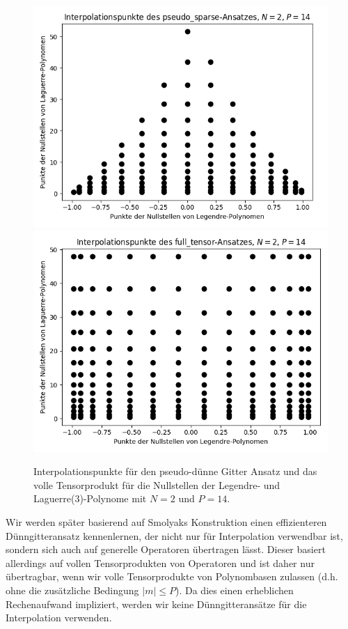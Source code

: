 \begin{figure}[!htb]
\centering
{}
  \includegraphics[width=\linewidth]{Figures/roots_pseudo_sparse.png}
\endminipage
{}
  \includegraphics[width=\linewidth]{Figures/roots_full_tensor.png}
\endminipage
\caption{Interpolationspunkte für den pseudo-dünne Gitter Ansatz und das volle Tensorprodukt für die Nullstellen der Legendre- und Laguerre(3)-Polynome mit $N=2$ und $P=14$.}
\label{fig:roots_two_dim}
\end{figure}

Wir werden später basierend auf Smolyaks Konstruktion einen effizienteren Dünngitteransatz kennenlernen, der nicht nur für Interpolation verwendbar ist, sondern sich auch auf generelle Operatoren übertragen lässt. Dieser basiert allerdings auf vollen Tensorprodukten von Operatoren und ist daher nur übertragbar, wenn wir volle Tensorprodukte von Polynombasen zulassen (d.h. ohne die zusätzliche Bedingung $|m|\le P$). Da dies einen erheblichen Rechenaufwand impliziert, werden wir keine Dünngitteransätze für die Interpolation verwenden.
